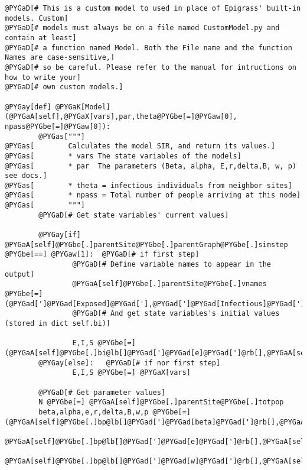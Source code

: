 \documentclass[a4paper,10pt]{manual}
\begin{document}
\begin{Verbatim}[commandchars=@\[\]]
@PYGaD[# This is a custom model to used in place of Epigrass' built-in models. Custom]
@PYGaD[# models must always be on a file named CustomModel.py and contain at least]
@PYGaD[# a function named Model. Both the File name and the function Names are case-sensitive,]
@PYGaD[# so be careful. Please refer to the manual for intructions on how to write your]
@PYGaD[# own custom models.]

@PYGay[def] @PYGaK[Model](@PYGaA[self],@PYGaX[vars],par,theta@PYGbe[=]@PYGaw[0], npass@PYGbe[=]@PYGaw[0]):
        @PYGas["""]
@PYGas[        Calculates the model SIR, and return its values.]
@PYGas[        * vars The state variables of the models]
@PYGas[        * par  The parameters (Beta, alpha, E,r,delta,B, w, p) see docs.]
@PYGas[        * theta = infectious individuals from neighbor sites]
@PYGas[        * npass = Total number of people arriving at this node]
@PYGas[        """]
        @PYGaD[# Get state variables' current values]

        @PYGay[if] @PYGaA[self]@PYGbe[.]parentSite@PYGbe[.]parentGraph@PYGbe[.]simstep @PYGbe[==] @PYGaw[1]:  @PYGaD[# if first step]
                @PYGaD[# Define variable names to appear in the output]
                @PYGaA[self]@PYGbe[.]parentSite@PYGbe[.]vnames @PYGbe[=] (@PYGad[']@PYGad[Exposed]@PYGad['],@PYGad[']@PYGad[Infectious]@PYGad['],@PYGad[']@PYGad[Susceptible]@PYGad['])
                @PYGaD[# And get state variables's initial values (stored in dict self.bi)]

                E,I,S @PYGbe[=] (@PYGaA[self]@PYGbe[.]bi@lb[]@PYGad[']@PYGad[e]@PYGad[']@rb[],@PYGaA[self]@PYGbe[.]bi@lb[]@PYGad[']@PYGad[i]@PYGad[']@rb[],@PYGaA[self]@PYGbe[.]bi@lb[]@PYGad[']@PYGad[s]@PYGad[']@rb[])
        @PYGay[else]:   @PYGaD[# if nor first step]
                E,I,S @PYGbe[=] @PYGaX[vars]

        @PYGaD[# Get parameter values]
        N @PYGbe[=] @PYGaA[self]@PYGbe[.]parentSite@PYGbe[.]totpop
        beta,alpha,e,r,delta,B,w,p @PYGbe[=] (@PYGaA[self]@PYGbe[.]bp@lb[]@PYGad[']@PYGad[beta]@PYGad[']@rb[],@PYGaA[self]@PYGbe[.]bp@lb[]@PYGad[']@PYGad[alpha]@PYGad[']@rb[],
        @PYGaA[self]@PYGbe[.]bp@lb[]@PYGad[']@PYGad[e]@PYGad[']@rb[],@PYGaA[self]@PYGbe[.]bp@lb[]@PYGad[']@PYGad[r]@PYGad[']@rb[],@PYGaA[self]@PYGbe[.]bp@lb[]@PYGad[']@PYGad[delta]@PYGad[']@rb[],@PYGaA[self]@PYGbe[.]bp@lb[]@PYGad[']@PYGad[b]@PYGad[']@rb[],
        @PYGaA[self]@PYGbe[.]bp@lb[]@PYGad[']@PYGad[w]@PYGad[']@rb[],@PYGaA[self]@PYGbe[.]bp@lb[]@PYGad[']@PYGad[p]@PYGad[']@rb[])


\end{Verbatim}
\end{document}
